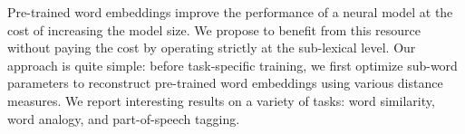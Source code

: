 Pre-trained word embeddings improve the performance of a neural model at the cost of increasing the model size. We propose to benefit from this resource without paying the cost by operating strictly at the sub-lexical level. Our approach is quite simple: before task-specific training, we first optimize sub-word parameters to reconstruct pre-trained word embeddings using various distance measures. We report interesting results on a variety of tasks: word similarity, word analogy, and part-of-speech tagging.
